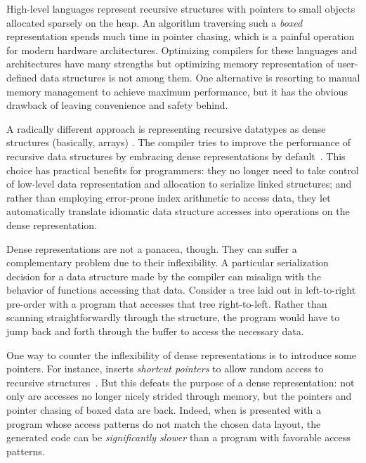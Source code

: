 
High-level languages represent recursive structures with pointers to small
objects allocated sparsely on the heap. An algorithm traversing such a
\emph{boxed} representation spends much time in pointer
chasing, which is a painful operation for
modern hardware architectures. Optimizing compilers for these languages and architectures have
many strengths but optimizing memory representation of user-defined data
structures is not among them. One alternative is resorting to manual memory
management to achieve maximum performance, but it has the obvious drawback of
leaving convenience and safety behind.

A radically different approach is representing recursive datatypes as dense structures
(basically, arrays) .
The \gibbon{} compiler tries to improve the performance of recursive data
structures by embracing dense representations by default~\cite{gibbon}. This choice has
practical benefits for programmers: they no longer need to take control of
low-level data representation and allocation to serialize linked structures; and
rather than employing error-prone index arithmetic to access data, they let \gibbon{}
automatically translate idiomatic data structure accesses into operations on
the dense representation.

Dense representations are not a panacea, though. They can suffer a complementary problem due to their inflexibility.
A particular serialization decision for a data structure made by the compiler
can misalign with the behavior of functions accessing that data.
%
Consider a tree laid out in left-to-right pre-order with a program that accesses that tree right-to-left.
%
Rather than scanning straightforwardly through the structure, the program would have to jump back and forth
through the buffer to access the necessary data.

One way to counter the inflexibility of dense representations is to introduce
some pointers.
For instance, \gibbon{} inserts {\em shortcut pointers} to allow random access to recursive structures~\cite{Local}.
%
But this defeats the purpose of a dense representation: not only are
accesses no longer nicely strided through memory, but the pointers and pointer
chasing of boxed data are back.
%
Indeed, when \gibbon{} is presented with a program whose access patterns do not match the chosen data layout,
the generated code can be {\em significantly slower} than a program with favorable access patterns. 

